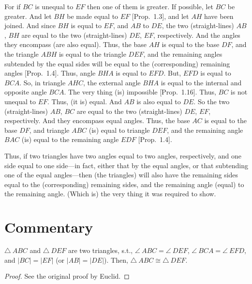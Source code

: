 For if $BC$ is unequal to $EF$ then one of them is greater. If possible, let $BC$
be greater. And let $BH$ be made equal to $EF$ [Prop.~1.3], and let $AH$ have been joined.
And since $BH$ is equal to $EF$, and $AB$ to $DE$, the two (straight-lines) $AB$, $BH$
are equal to the two (straight-lines) $DE$, $EF$, respectively. And the angles
they encompass (are also equal). Thus, the base $AH$ is equal to the base  
$DF$, and the triangle $ABH$ is equal to the triangle $DEF$, and the
remaining angles subtended by the equal sides will be equal to the
(corresponding) remaining angles [Prop.~1.4]. Thus, angle $BHA$ 
is equal to $EFD$. But, $EFD$ is equal to $BCA$. So, in triangle $AHC$,
the external angle $BHA$ is equal to the internal and opposite angle 
$BCA$. The very thing (is) impossible [Prop.~1.16]. Thus, $BC$ is not unequal to $EF$.
Thus, (it is) equal. And $AB$ is also equal to $DE$. So the two
(straight-lines) $AB$, $BC$ are equal to the two (straight-lines) $DE$, $EF$,
respectively. And they encompass equal angles. Thus, the base $AC$ is equal
to the base $DF$, and triangle $ABC$ (is) equal to triangle $DEF$, and the
remaining angle $BAC$ (is) equal to the remaining angle $EDF$ [Prop.~1.4].

Thus, if two triangles have two angles equal to two angles, respectively, 
and one side equal to one side---in fact, either that by the equal angles, or that
subtending one of the equal angles---then (the triangles) will also have the remaining sides equal to the (corresponding) remaining sides, and the
remaining angle (equal) to the remaining angle. (Which is) the very thing it
was required to show.



\section*{Commentary}

\begin{proposition}\label{proposition_26}\leanok
    $\triangle~ABC$ and $\triangle~DEF$ are two triangles, s.t., $\angle~ABC=\angle~DEF$, $\angle~BCA=\angle~EFD$, and $|BC|=|EF|$ (or $|AB|=|DE|$). Then, $\triangle~ABC\cong\triangle~DEF$.
\end{proposition}
\begin{proof}
    \leanok
    See the original proof by Euclid.
\end{proof}



